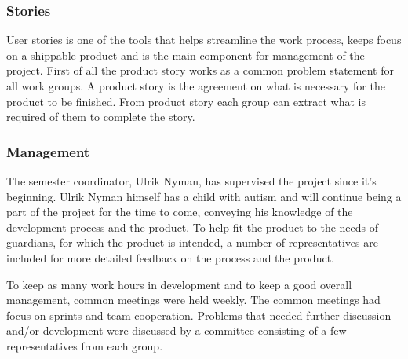 \subsubsection{Stories}
\label{subsub:stories}
User stories is one of the tools that helps streamline the work process, keeps focus on a shippable product and is the main component for management of the project. First of all the product story works as a common problem statement for all work groups. A product story is the agreement on what is necessary for the product to be finished. From product story each group can extract what is required of them to complete the story.

\subsubsection{Management}
\label{subsub:management}
The semester coordinator, Ulrik Nyman, has supervised the project since it's beginning. Ulrik Nyman himself has a child with autism and will continue being a part of the project for the time to come, conveying his knowledge of the development process and the product.
To help fit the product to the needs of guardians, for which the product is intended, a number of representatives are included for more detailed feedback on the process and the product.


To keep as many work hours in development and to keep a good overall management, common meetings were held weekly.
The common meetings had focus on sprints and team cooperation. Problems that needed further discussion and/or development were discussed by a committee consisting of a few representatives from each group.

